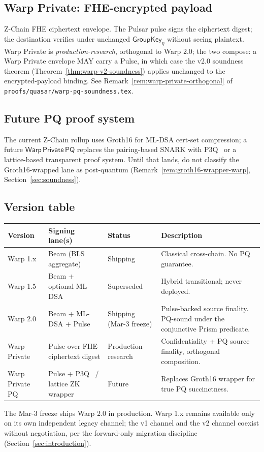 \subsection{Warp Private: FHE-encrypted payload}
\label{sec:warp-private}

Z-Chain FHE ciphertext envelope. The Pulsar pulse signs the ciphertext digest; the destination verifies under unchanged $\mathsf{GroupKey}_\eta$ without seeing plaintext. Warp Private is \emph{production-research}, orthogonal to Warp 2.0; the two compose: a Warp Private envelope MAY carry a Pulse, in which case the v2.0 soundness theorem (Theorem~\ref{thm:warp-v2-soundness}) applies unchanged to the encrypted-payload binding. See Remark~\ref{rem:warp-private-orthogonal} of \texttt{proofs/quasar/warp-pq-soundness.tex}.

\subsection{Future PQ proof system}

The current Z-Chain rollup uses Groth16 for ML-DSA cert-set compression; a future $\mathsf{Warp\,Private\,PQ}$ replaces the pairing-based SNARK with P3Q~\cite{luxp3q} or a lattice-based transparent proof system. Until that lands, do not classify the Groth16-wrapped lane as post-quantum (Remark~\ref{rem:groth16-wrapper-warp}, Section~\ref{sec:soundness}).

\subsection{Version table}

\begin{tabular}{@{}p{}p{}p{}p{}@{}}
  \toprule
  \textbf{Version} & \textbf{Signing lane(s)} & \textbf{Status} & \textbf{Description} \\
  \midrule
  Warp 1.x & Beam (BLS aggregate) & Shipping & Classical cross-chain. No PQ guarantee. \\
  Warp 1.5 & Beam + optional ML-DSA & Superseded & Hybrid transitional; never deployed. \\
  Warp 2.0 & Beam + ML-DSA + Pulse & Shipping (Mar-3 freeze) & Pulse-backed source finality. PQ-sound under the conjunctive Prism predicate. \\
  Warp Private & Pulse over FHE ciphertext digest & Production-research & Confidentiality + PQ source finality, orthogonal composition. \\
  Warp Private PQ & Pulse + P3Q~\cite{luxp3q} / lattice ZK wrapper & Future & Replaces Groth16 wrapper for true PQ succinctness. \\
  \bottomrule
\end{tabular}

The Mar-3 freeze ships Warp 2.0 in production. Warp 1.x remains available only on its own independent legacy channel; the v1 channel and the v2 channel coexist without negotiation, per the forward-only migration discipline (Section~\ref{sec:introduction}).
